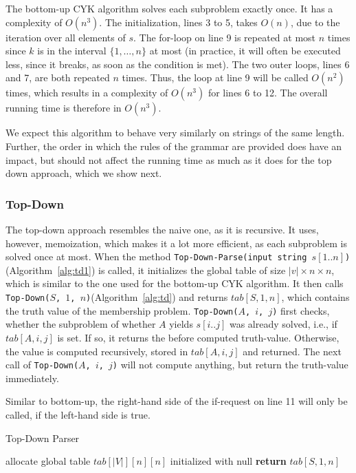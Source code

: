 The bottom-up CYK algorithm solves each subproblem exactly once.
It has a complexity of $O(n^3)$.
The initialization, lines 3 to 5, takes $O(n)$, due to the iteration over all elements of $s$.
The for-loop on line 9 is repeated at most $n$ times since $k$ is in the interval $\{1,\dots,n\}$ at most (in practice, it will often be executed less, since it breaks, as soon as the condition is met).
The two outer loops, lines 6 and 7, are both repeated $n$ times.
Thus, the loop at line 9 will be called $O(n^2)$ times, which results in a complexity of $O(n^3)$ for lines 6 to 12.
The overall running time is therefore in $O(n^3)$.

We expect this algorithm to behave very similarly on strings of the same length.
Further, the order in which the rules of the grammar are provided does have an impact, but should not affect the running time as much as it does for the top down approach, which we show next.

\subsubsection{Top-Down}
\label{sec:top_down}
The top-down approach resembles the naive one, as it is recursive.
It uses, however, memoization, which makes it a lot more efficient, as each subproblem is solved once at most.
When the method \texttt{Top-Down-Parse(input string $s[1..n]$)}(Algorithm~\ref{alg:td1}) is called, it initializes the global table of size $|v|\times n\times n$, which is similar to the one used for the bottom-up CYK algorithm.
It then calls \texttt{Top-Down($S$, $1$, $n$)}(Algorithm~\ref{alg:td}) and returns $tab[S,1,n]$, which contains the truth value of the membership problem.
\texttt{Top-Down($A$, $i$, $j$)} first checks, whether the subproblem of whether $A$ yields $s[i..j]$ was already solved, i.e., if $tab[A,i,j]$ is set.
If so, it returns the before computed truth-value.
Otherwise, the value is computed recursively, stored in $tab[A,i,j]$ and returned.
The next call of \texttt{Top-Down($A$, $i$, $j$)} will not compute anything, but return the truth-value immediately.

Similar to bottom-up, the right-hand side of the if-request on line 11 will only be called, if the left-hand side is true.

\begin{algorithm}[H]
    \caption{Top-Down Parser}
    \label{alg:td1}
    \begin{algorithmic}[1]
        \State allocate global table $tab[|V|][n][n]$ initialized with null
        \State {}
        \State \textbf{return} $tab[S,1,n]$
        \EndProcedure
    \end{algorithmic}
\end{algorithm}

